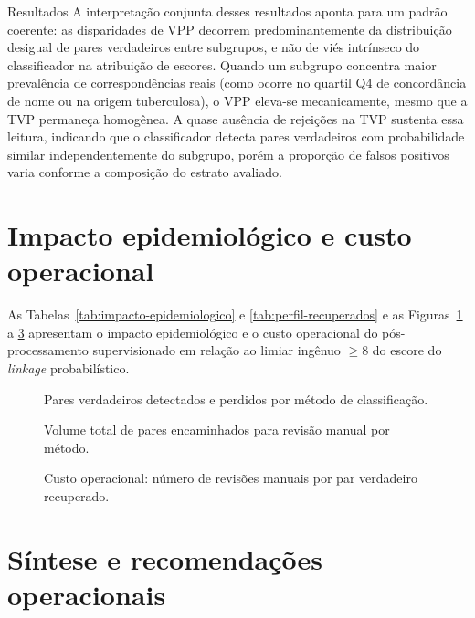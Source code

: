 \begin{chapter}{Resultados}
A interpretação conjunta desses resultados aponta para um padrão coerente: as disparidades de VPP decorrem predominantemente da distribuição desigual de pares verdadeiros entre subgrupos, e não de viés intrínseco do classificador na atribuição de escores.
Quando um subgrupo concentra maior prevalência de correspondências reais (como ocorre no quartil Q4 de concordância de nome ou na origem tuberculosa), o VPP eleva-se mecanicamente, mesmo que a TVP permaneça homogênea.
A quase ausência de rejeições na TVP sustenta essa leitura, indicando que o classificador detecta pares verdadeiros com probabilidade similar independentemente do subgrupo, porém a proporção de falsos positivos varia conforme a composição do estrato avaliado.

\section{Impacto epidemiológico e custo operacional}
\label{sec:cap5-impacto-epidemiologico}

As Tabelas~\ref{tab:impacto-epidemiologico} e \ref{tab:perfil-recuperados} e as Figuras~\ref{fig:epi-deteccao} a \ref{fig:epi-custo} apresentam o impacto epidemiológico e o custo operacional do pós-processamento supervisionado em relação ao limiar ingênuo $\geq 8$ do escore do \textit{linkage} probabilístico.





\begin{figure}[!ht]
\centering

\caption{Pares verdadeiros detectados e perdidos por método de classificação.}
\label{fig:epi-deteccao}
\end{figure}

\begin{figure}[!ht]
\centering

\caption{Volume total de pares encaminhados para revisão manual por método.}
\label{fig:epi-revisoes}
\end{figure}

\begin{figure}[!ht]
\centering

\caption{Custo operacional: número de revisões manuais por par verdadeiro recuperado.}
\label{fig:epi-custo}
\end{figure}

\section{Síntese e recomendações operacionais}
\label{sec:cap5-sintese}


\end{chapter}
